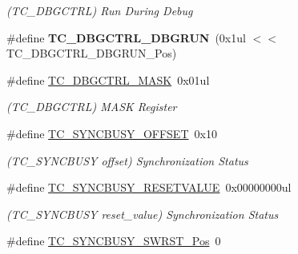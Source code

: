 \begin{DoxyCompactItemize}
\begin{DoxyCompactList}\small\item\em (T\+C\+\_\+\+D\+B\+G\+C\+T\+R\+L) Run During Debug \end{DoxyCompactList}\item 
\hypertarget{group___s_a_m_l21___t_c_gad29a80ca0b9ccb69c8f1d4207d95bfea}{}\#define {\bfseries T\+C\+\_\+\+D\+B\+G\+C\+T\+R\+L\+\_\+\+D\+B\+G\+R\+U\+N}~(0x1ul $<$$<$ T\+C\+\_\+\+D\+B\+G\+C\+T\+R\+L\+\_\+\+D\+B\+G\+R\+U\+N\+\_\+\+Pos)\label{group___s_a_m_l21___t_c_gad29a80ca0b9ccb69c8f1d4207d95bfea}

\item 
\hypertarget{group___s_a_m_l21___t_c_ga38efec6f84caeb2a285ce88314a6b320}{}\#define \hyperlink{group___s_a_m_l21___t_c_ga38efec6f84caeb2a285ce88314a6b320}{T\+C\+\_\+\+D\+B\+G\+C\+T\+R\+L\+\_\+\+M\+A\+S\+K}~0x01ul\label{group___s_a_m_l21___t_c_ga38efec6f84caeb2a285ce88314a6b320}

\begin{DoxyCompactList}\small\item\em (T\+C\+\_\+\+D\+B\+G\+C\+T\+R\+L) M\+A\+S\+K Register \end{DoxyCompactList}\item 
\hypertarget{group___s_a_m_l21___t_c_ga1b78e2c1fe1ba63dcaac49eeee102889}{}\#define \hyperlink{group___s_a_m_l21___t_c_ga1b78e2c1fe1ba63dcaac49eeee102889}{T\+C\+\_\+\+S\+Y\+N\+C\+B\+U\+S\+Y\+\_\+\+O\+F\+F\+S\+E\+T}~0x10\label{group___s_a_m_l21___t_c_ga1b78e2c1fe1ba63dcaac49eeee102889}

\begin{DoxyCompactList}\small\item\em (T\+C\+\_\+\+S\+Y\+N\+C\+B\+U\+S\+Y offset) Synchronization Status \end{DoxyCompactList}\item 
\hypertarget{group___s_a_m_l21___t_c_ga2c78afb48deb6eb1b39e043100c0b9c2}{}\#define \hyperlink{group___s_a_m_l21___t_c_ga2c78afb48deb6eb1b39e043100c0b9c2}{T\+C\+\_\+\+S\+Y\+N\+C\+B\+U\+S\+Y\+\_\+\+R\+E\+S\+E\+T\+V\+A\+L\+U\+E}~0x00000000ul\label{group___s_a_m_l21___t_c_ga2c78afb48deb6eb1b39e043100c0b9c2}

\begin{DoxyCompactList}\small\item\em (T\+C\+\_\+\+S\+Y\+N\+C\+B\+U\+S\+Y reset\+\_\+value) Synchronization Status \end{DoxyCompactList}\item 
\hypertarget{group___s_a_m_l21___t_c_ga6d8eb1c9ffb8d24eb9fcb271a91ea89a}{}\#define \hyperlink{group___s_a_m_l21___t_c_ga6d8eb1c9ffb8d24eb9fcb271a91ea89a}{T\+C\+\_\+\+S\+Y\+N\+C\+B\+U\+S\+Y\+\_\+\+S\+W\+R\+S\+T\+\_\+\+Pos}~0\label{group___s_a_m_l21___t_c_ga6d8eb1c9ffb8d24eb9fcb271a91ea89a}


\end{DoxyCompactItemize}
